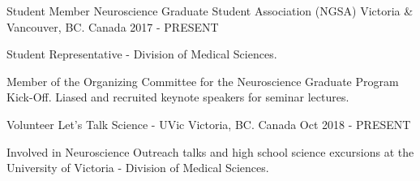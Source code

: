\begin{cventries}
  \cventry
    {Student Member} %
    {Neuroscience Graduate Student Association (NGSA)} %
    {Victoria \& Vancouver, BC. Canada} %
    {2017 - PRESENT} %
    {
      \begin{cvitems} %
        \item {Student Representative - Division of Medical Sciences.}
        \item {Member of the Organizing Committee for the Neuroscience Graduate Program Kick-Off. Liased and recruited keynote speakers for seminar lectures.}
      \end{cvitems}
    }
    \cventry
    {Volunteer} %
    {Let's Talk Science - UVic} %
    {Victoria, BC. Canada} %
    {Oct 2018 - PRESENT} %
    {
    \begin{cvitems} %
    \item {Involved in Neuroscience Outreach talks and high school science excursions at the University of Victoria - Division of Medical Sciences.}
    \end{cvitems}
    }


\end{cventries}
